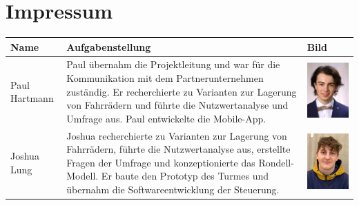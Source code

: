 \section{Impressum}


\begin{table}
    \begin{center}
    \begin{tabular}{|p{}|p{}|p{}|}
      \hline
      \textbf{Name} & \textbf{Aufgabenstellung} & \textbf{Bild} \\
      \hline
      Paul Hartmann & Paul übernahm die Projektleitung und war für die Kommunikation mit dem Partnerunternehmen zuständig. Er recherchierte zu Varianten zur Lagerung von Fahrrädern und führte die Nutzwertanalyse und Umfrage aus. Paul entwickelte die Mobile-App. & \begin{minipage}{.3\textwidth} \includegraphics{images/paulhartmann.jpg} \end{minipage}\\
      \hline
      Joshua Lung & Joshua recherchierte zu Varianten zur Lagerung von Fahrrädern, führte die Nutzwertanalyse aus, erstellte Fragen der Umfrage und konzeptionierte das Rondell-Modell. Er baute den Prototyp des Turmes und übernahm die Softwareentwicklung der Steuerung. & \begin{minipage}{.3\textwidth}\includegraphics{images/joshualung.jpg} \end{minipage}\\

\end{tabular}
\end{center}
\end{table}
